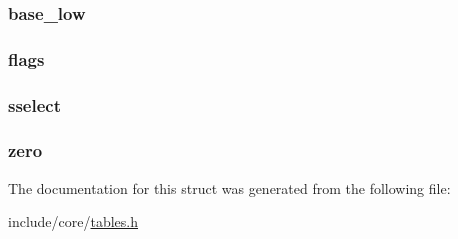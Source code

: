 \subsubsection[{\texorpdfstring{base\+\_\+low}{base_low}}]{ base\+\_\+low}\hypertarget{structidt__entry__struct_a0a776dced2c26f16298425cde39f8364}{}\label{structidt__entry__struct_a0a776dced2c26f16298425cde39f8364}
\subsubsection[{\texorpdfstring{flags}{flags}}]{ flags}\hypertarget{structidt__entry__struct_a138dda98fcd4738346af61bcca8cf4b4}{}\label{structidt__entry__struct_a138dda98fcd4738346af61bcca8cf4b4}
\subsubsection[{\texorpdfstring{sselect}{sselect}}]{ sselect}\hypertarget{structidt__entry__struct_ab3f34507900160b4a9b309b4ed039e07}{}\label{structidt__entry__struct_ab3f34507900160b4a9b309b4ed039e07}
\subsubsection[{\texorpdfstring{zero}{zero}}]{ zero}\hypertarget{structidt__entry__struct_a94515e42687e7508877c09da81f86860}{}\label{structidt__entry__struct_a94515e42687e7508877c09da81f86860}


The documentation for this struct was generated from the following file\+:\begin{DoxyCompactItemize}
\item 
include/core/\hyperlink{tables_8h}{tables.\+h}\end{DoxyCompactItemize}
